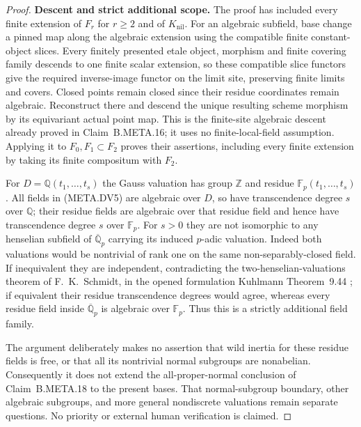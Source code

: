 \begin{proof}
\medskip\noindent\textbf{Descent and strict additional scope.}
The proof has included every finite extension of
$F_r$ for $r\ge2$ and of $K_{\mathrm{nil}}$.
For an algebraic subfield, base change a pinned map
along the algebraic extension using the compatible
finite constant-object slices.
Every finitely presented etale object, morphism
and finite covering family descends to one finite
scalar extension, so these compatible slice functors
give the required inverse-image functor on the limit
site, preserving finite limits and covers.
Closed points remain closed since their residue
coordinates remain algebraic.
Reconstruct there and descend the unique resulting
scheme morphism by its equivariant actual point map.
This is the finite-site algebraic descent already
proved in Claim~B.META.16; it uses no finite-local-field
assumption.
Applying it to $F_0,F_1\subset F_2$ proves their
assertions, including every finite extension by
taking its finite compositum with $F_2$.

For $D=\mathbb Q(t_1,\ldots,t_s)$ the Gauss
valuation has group $\mathbb Z$ and residue
$\mathbb F_p(t_1,\ldots,t_s)$.
All fields in (META.DV5) are algebraic over $D$,
so have transcendence degree $s$ over $\mathbb Q$;
their residue fields are algebraic over that
residue field and hence have transcendence degree
$s$ over $\mathbb F_p$.
For $s>0$ they are not isomorphic to any henselian
subfield of $\overline{\mathbb Q}_p$ carrying its
induced $p$-adic valuation.
Indeed both valuations would be nontrivial of
rank one on the same non-separably-closed field.
If inequivalent they are independent, contradicting
the two-henselian-valuations theorem of F.\ K.\ Schmidt,
in the opened formulation Kuhlmann Theorem~9.44
\citep{AN_Kuhlmann9}; if equivalent their residue
transcendence degrees would agree, whereas every
residue field inside $\overline{\mathbb Q}_p$ is
algebraic over $\mathbb F_p$.
Thus this is a strictly additional field family.

The argument deliberately makes no assertion that
wild inertia for these residue fields is free,
or that all its nontrivial normal subgroups are
nonabelian.
Consequently it does not extend the all-proper-normal
conclusion of Claim~B.META.18 to the present bases.
That normal-subgroup boundary, other algebraic
subgroups, and more general nondiscrete valuations
remain separate questions.
No priority or external human verification is claimed.
\end{proof}
